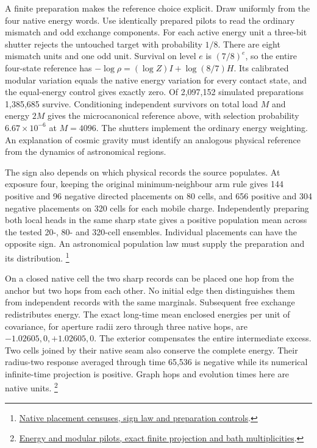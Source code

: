 \documentclass[11pt]{article}
\begin{document}
A finite preparation makes the reference choice explicit. Draw
uniformly from the four native energy words. Use identically
prepared pilots to read the ordinary mismatch and odd exchange
components. For each active energy unit a three-bit shutter rejects
the untouched target with probability $1/8$. There are eight mismatch
units and one odd unit. Survival on level $e$ is $(7/8)^e$, so the
entire four-state reference has
$-\log\rho=(\log Z)I+\log(8/7)H$. Its calibrated modular variation
equals the native energy variation for every contact state, and the
equal-energy control gives exactly zero. Of 2,097,152 simulated
preparations 1,385,685 survive. Conditioning independent survivors
on total load $M$ and energy $2M$ gives the microcanonical reference
above, with selection probability $6.67\times10^{-6}$ at $M=4096$.
The shutters implement the ordinary energy weighting. An explanation
of cosmic gravity must identify an analogous physical reference
from the dynamics of astronomical regions.

The sign also depends on which physical records the source populates.
At exposure four, keeping the original minimum-neighbour arm rule
gives 144 positive and 96 negative directed placements on 80 cells,
and 656 positive and 304 negative placements on 320 cells for each
mobile charge. Independently preparing both local heads in the same
sharp state gives a positive population mean across the tested
20-, 80- and 320-cell ensembles. Individual placements can
have the opposite sign. An astronomical population law must supply
the preparation and its distribution.%
\footnote{\href{https://github.com/FloatingPragma/observer-patch-holography/tree/main/model/experiments/interval_echo_einstein_station/mobile_collar_source/placement}{Native placement censuses, sign law and preparation controls}.}

On a closed native cell the two sharp records can be placed one hop
from the anchor but two hops from each other. No initial edge then
distinguishes them from independent records with the same marginals.
Subsequent free exchange redistributes energy. The exact long-time
mean enclosed energies per unit of covariance, for aperture radii
zero through three native hops, are $-1.02605,0,+1.02605,0$.
The exterior compensates the entire intermediate excess. Two cells
joined by their native seam also conserve the complete energy. Their
radius-two response averaged through time 65,536 is negative
while its numerical infinite-time projection is positive. Graph hops
and evolution times here are native units.%
\footnote{\href{https://github.com/FloatingPragma/observer-patch-holography/tree/main/model/experiments/interval_echo_shell_flux/product_address/green_response/material_recoil/overlap_source/closed_region}{Energy and modular pilots, exact finite projection and bath multiplicities}.}
\end{document}
